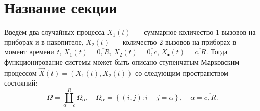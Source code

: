 

\section{Название секции}
\label{chap1:sec3}

%
Введём два случайных процесса $X_1 (t)$~--- суммарное количество
1-вызовов на приборах и в накопителе, $X_2 (t)$~--- количество
2-вызовов на приборах в момент времени $t$, $X_1 (t) = \overline {0,R}
$, $X_2 (t) = \overline {0,c} $, $X_\bullet (t) = \overline {c,R}
$. Тогда функционирование системы может быть описано ступенчатым
Марковским процессом $\overrightarrow X (t) = (X_1 (t),X_2 (t))$ со
следующим пространством состояний:
\begin{equation}
\label{eq:01}
\Omega = \coprod\limits_{\alpha = c}^R \Omega _\alpha , \quad 
\Omega _\alpha = \left\{ {(i,j):i + j = \alpha } 
\right\}, \quad \alpha = \overline {c,R}.
\end{equation}




